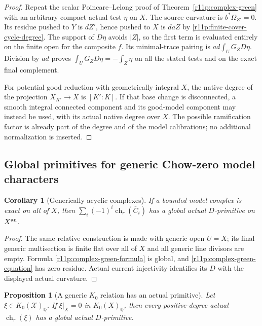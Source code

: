 \documentclass[11pt]{article}
\newtheorem{proposition}[theorem]{Proposition}
\newtheorem{corollary}[theorem]{Corollary}
\theoremstyle{definition}
\theoremstyle{remark}
\numberwithin{equation}{section}
\begin{document}
\begin{proof}
Repeat the scalar Poincare--Lelong proof of
Theorem~\ref{r11p:complex-green} with an arbitrary compact actual
test $\eta$ on $X$.  The source curvature is
$b^*\Omega_{Z'}=0$.  Its residue pushed to $Y$ is $dZ'$, hence
pushed to $X$ is $daZ$ by
\eqref{r11p:finite-cover-cycle-degree}.  The support of $D\eta$
avoids $|Z|$, so the first term is evaluated entirely on the
finite open for the composite $f$.  Its minimal-trace pairing
is $ad\int_U G_ZD\eta$.  Division by $ad$ proves
$\int_U G_ZD\eta=-\int_Z\eta$ on all the stated tests and on the
exact final complement.

For potential good reduction with geometrically integral $X$, the
native degree of the projection $X_{K'}\to X$ is $[K':K]$.
If that base change is disconnected, a smooth integral connected
component and its good-model component may instead be used, with its
actual native degree over $X$.  The possible ramification factor is
already part of the degree and of the model calibrations; no
additional normalization is inserted.
\end{proof}

\subsection{Global primitives for generic Chow-zero model characters}

\begin{corollary}[Generically acyclic complexes]
\label{r11p:acyclic}
If a bounded model complex is exact on all of $X$, then
$\sum_i(-1)^i\operatorname{ch}_r(\overline C_i)$ has a global actual
$D$-primitive on $X^{\rm an}$.
\end{corollary}

\begin{proof}
The same relative construction is made with generic open $U=X$;
its final generic multisection is finite flat over all of $X$ and all
generic line divisors are empty.  Formula \eqref{r11p:complex-green-formula}
is global, and \eqref{r11p:complex-green-equation} has zero residue.
Actual current injectivity identifies its $D$ with the displayed
actual curvature.
\end{proof}

\begin{proposition}[A generic $K_0$ relation has an actual primitive]
\label{r11p:generic-k-primitive}
Let $\xi\in K_0(\mathcal X)_{\mathbb Q}$.  If $\xi|_X=0$ in
$K_0(X)_{\mathbb Q}$, then every positive-degree actual
$\operatorname{ch}_r(\xi)$ has a global actual $D$-primitive.
\end{proposition}
\end{document}
